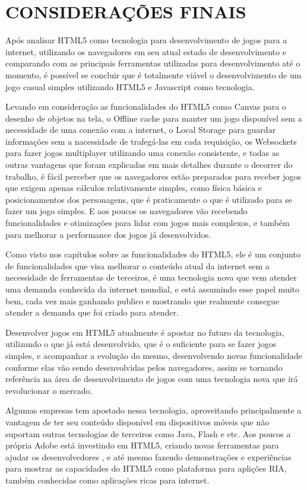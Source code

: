 \section[Considerações finais]{CONSIDERAÇÕES FINAIS}

Após analisar HTML5 como tecnologia para desenvolvimento de jogos para
a internet, utilizando os navegadores em seu atual estado de
desenvolvimento e comparando com as principais ferramentas utilizadas
para desenvolvimento até o momento, é possível se concluir que é
totalmente viável o desenvolvimento de um jogo casual simples
utilizando HTML5 e Javascript como tecnologia.

Levando em consideração as funcionalidades do HTML5 como Canvas para o
desenho de objetos na tela, o Offline cache para manter um jogo
disponível sem a necessidade de uma conexão com a internet, o Local
Storage para guardar informações sem a nacessidade de trafegá-las em
cada requisição, os Websockets para fazer jogos multiplayer utilizando
uma conexão consistente, e todas as outras vantagens que foram
explicadas em mais detalhes durante o decorrer do trabalho,
é fácil perceber que os navegadores estão preparados para
receber jogos que exigem apenas cálculos relativamente
simples, como física básica e posicionamentos dos personagens, que é
praticamente o que é utilizado para se fazer um jogo simples. E aos
poucos os navegadores vão recebendo funcionalidades e otimizações para
lidar com jogos mais complexos, e também para melhorar a performance
dos jogos já desenvolvidos.

Como visto nos capítulos sobre as funcionalidades do HTML5, ele é um
conjunto de funcionalidades que visa melhorar o conteúdo
atual da internet sem a necessidade de ferramentas de terceiros, é uma
tecnologia nova que vem atender uma demanda conhecida da
internet mundial, e está assumindo esse papel muito bem, cada vez mais
ganhando publico e mostrando que realmente consegue atender a demanda
que foi criado para atender.

Desenvolver jogos em HTML5 atualmente é
apostar no futuro da tecnologia, utilizando o que já está
desenvolvido, que é o suficiente para se fazer jogos simples, e
acompanhar a evolução do mesmo, desenvolvendo novas funcionalidade
conforme elas vão sendo desenvolvidas pelos navegadores, assim se
tornando referência na área de desenvolvimento de jogos com uma
tecnologia nova que irá revolucionar o mercado.

Algumas empresas tem apostado nessa tecnologia, aproveitando
principalmente a vantagem de ter seu conteúdo disponível em
dispositivos móveis que não suportam outras tecnologias de terceiros
como Java, Flash e etc. Aos poucos a própria Adobe está investindo em
HTML5, criando novas ferramentas para ajudar
os desenvolvedores \cite{website:adobeedge}, e até mesmo fazendo
demonstrações e experiências para mostrar as capacidades do HTML5 como
plataforma para aplições RIA, também conhecidas como aplicações ricas
para internet.

